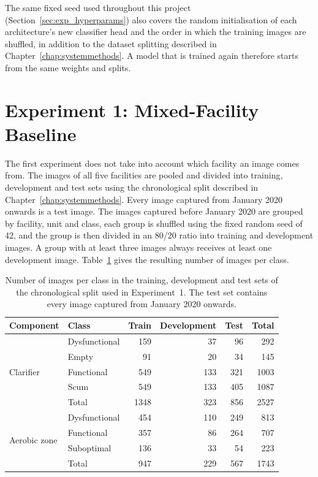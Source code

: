 The same fixed seed used throughout this project (Section~\ref{sec:exp_hyperparams}) also covers the random initialisation of each architecture's new classifier head and the order in which the training images are shuffled, in addition to the dataset splitting described in Chapter~\ref{chap:systemmethods}. A model that is trained again therefore starts from the same weights and splits.


\section{Experiment 1: Mixed-Facility Baseline}
\label{sec:exp_mixed}

The first experiment does not take into account which facility an image comes from. The images of all five facilities are pooled and divided into training, development and test sets using the chronological split described in Chapter~\ref{chap:systemmethods}. Every image captured from January 2020 onwards is a test image. The images captured before January 2020 are grouped by facility, unit and class, each group is shuffled using the fixed random seed of 42, and the group is then divided in an 80/20 ratio into training and development images. A group with at least three images always receives at least one development image. Table~\ref{tab:stratified_split} gives the resulting number of images per class.

\begin{table}[!htb]
\centering
\caption{Number of images per class in the training, development and test sets of the chronological split used in Experiment~1. The test set contains every image captured from January 2020 onwards.}
\label{tab:stratified_split}
\begin{tabular}{llrrrr}
\toprule
\textbf{Component} & \textbf{Class} & \textbf{Train} & \textbf{Development} & \textbf{Test} & \textbf{Total} \\
\midrule
\multirow{5}{*}{Clarifier}    & Dysfunctional & 159  & 37  & 96  & 292  \\
                              & Empty         & 91   & 20  & 34  & 145  \\
                              & Functional    & 549  & 133 & 321 & 1003 \\
                              & Scum          & 549  & 133 & 405 & 1087 \\
\cmidrule(lr){2-6}
                              & Total         & 1348 & 323 & 856 & 2527 \\
\midrule
\multirow{4}{*}{Aerobic zone} & Dysfunctional & 454  & 110 & 249 & 813  \\
                              & Functional    & 357  & 86  & 264 & 707  \\
                              & Suboptimal    & 136  & 33  & 54  & 223  \\
\cmidrule(lr){2-6}
                              & Total         & 947  & 229 & 567 & 1743 \\
\bottomrule
\end{tabular}
\end{table}

